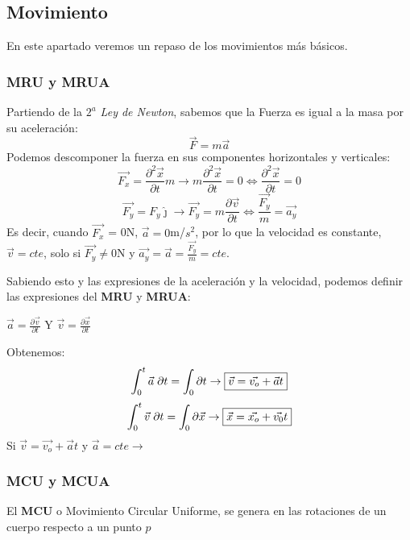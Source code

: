 \setlength{\parindent}{0ex}
\subsection{Movimiento}
En este apartado veremos un repaso de los movimientos más básicos.


\subsubsection{MRU y MRUA}

Partiendo de la \textit{\(2^a\) Ley de Newton}, sabemos que la Fuerza es igual a la masa por su aceleración:
\[\vec{F} = m\vec{a}\]
Podemos descomponer la fuerza en sus componentes horizontales y verticales:
\[
        \vec{F_{x}}=\frac{\partial^{2}\vec{x}}{\partial{t}}m
        \to
        m\frac{\partial^2 \vec{x}}{\partial t} = 0
        \Leftrightarrow
        \frac{\partial^2{\vec{x}}}{\partial{t}} = 0
\]
\[
        \vec{F_{y}}=F_{y}\hat{\jmath}
        \to
        \vec{F_y} = m\frac{\partial\vec{v}}{\partial t}\Leftrightarrow
        \frac{\vec{F_y}}{m} = \vec{a_y}
\]
Es decir, cuando \(\vec{F_x}\) = 0N, \(\vec{a}=0\)m/\(s^2\), por lo que la velocidad es constante, \(\vec{v}=cte\), solo si \(\vec{F_y}\neq 0\)N y \(\vec{a_y} = \vec{a} = \frac{\vec{F_y}}{m}=cte\).\par \vspace{0.5cm} Sabiendo esto y las expresiones de la aceleración y la velocidad, podemos definir las expresiones del \textbf{MRU} y \textbf{MRUA}: \par \vspace{0.5cm} \hspace{5cm}
\( \vec{a} = \frac{\partial \vec{v} }{\partial t}\) Y \( \vec{v} = \frac{\partial \vec{x} }{\partial t}\) \par \vspace{0.5cm} Obtenemos:
\[
        \int_{0}^{t}{\vec{a}\hspace{1mm}\partial{t}} = \int_{0}\partial{t}
        \to
        \boxed{\vec{v} = \vec{v_o} + \vec{a}t}
\]
\[
        \int_{0}^{t}{\vec{v}\hspace{1mm}\partial{t}} = \int_{0}{\partial{\vec{x}}}
        \to
        \boxed{\vec{x} = \vec{x_o} + \vec{v_0}t}
\]
\hspace{1.1cm} Si \( \vec{v} = \vec{v_o} + \vec{a}t\)
y
\( \vec{a} = cte \to\) 

\subsubsection{MCU y MCUA}
\vspace{0.5cm}


El \textbf{MCU} o Movimiento Circular Uniforme, se genera en las rotaciones de un cuerpo respecto a un punto \(p\)